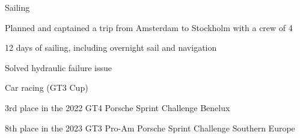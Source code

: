 


\begin{cventries}


\cventry
{}
{Sailing}
{}
{}
{ %
\begin{cvitems}
\item{Planned and captained a trip from Amsterdam to Stockholm with a crew of 4}
\item{12 days of sailing, including overnight sail and navigation}
\item{Solved hydraulic failure issue}
\end{cvitems}
}


\cventry
{} %
{Car racing (GT3 Cup)}
{}
{}
{ %
\begin{cvitems}
\item{3rd place in the 2022 GT4 Porsche Sprint Challenge Benelux}
\item{8th place in the 2023 GT3 Pro-Am Porsche Sprint Challenge Southern Europe}
\end{cvitems}
}

\end{cventries}